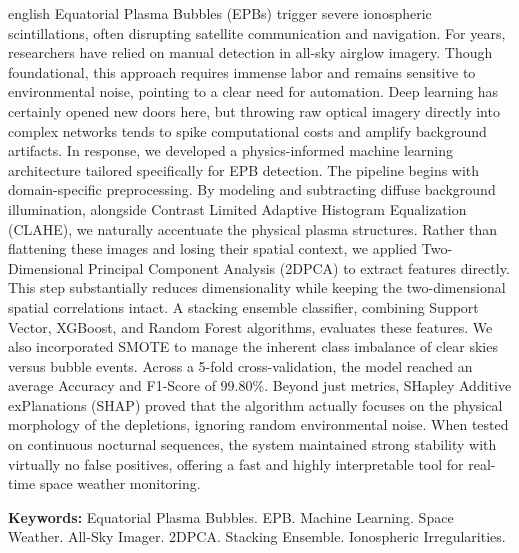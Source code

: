 \begin{resumo}[Abstract]
\begin{otherlanguage*}{english}
Equatorial Plasma Bubbles (EPBs) trigger severe ionospheric scintillations, often disrupting satellite communication and navigation. For years, researchers have relied on manual detection in all-sky airglow imagery. Though foundational, this approach requires immense labor and remains sensitive to environmental noise, pointing to a clear need for automation. Deep learning has certainly opened new doors here, but throwing raw optical imagery directly into complex networks tends to spike computational costs and amplify background artifacts. In response, we developed a physics-informed machine learning architecture tailored specifically for EPB detection. The pipeline begins with domain-specific preprocessing. By modeling and subtracting diffuse background illumination, alongside Contrast Limited Adaptive Histogram Equalization (CLAHE), we naturally accentuate the physical plasma structures. Rather than flattening these images and losing their spatial context, we applied Two-Dimensional Principal Component Analysis (2DPCA) to extract features directly. This step substantially reduces dimensionality while keeping the two-dimensional spatial correlations intact. A stacking ensemble classifier, combining Support Vector, XGBoost, and Random Forest algorithms, evaluates these features. We also incorporated SMOTE to manage the inherent class imbalance of clear skies versus bubble events. Across a 5-fold cross-validation, the model reached an average Accuracy and F1-Score of 99.80\%. Beyond just metrics, SHapley Additive exPlanations (SHAP) proved that the algorithm actually focuses on the physical morphology of the depletions, ignoring random environmental noise. When tested on continuous nocturnal sequences, the system maintained strong stability with virtually no false positives, offering a fast and highly interpretable tool for real-time space weather monitoring.

\vspace{\onelineskip}
\noindent \textbf{Keywords:} Equatorial Plasma Bubbles. EPB. Machine Learning. Space Weather. All-Sky Imager. 2DPCA. Stacking Ensemble. Ionospheric Irregularities.
\end{otherlanguage*}
\end{resumo}
